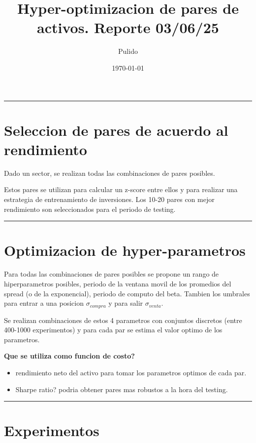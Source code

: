 \documentclass{myarticle}
\author{Pulido}
\date{\today}
\title{Hyper-optimizacion de pares de activos.  Reporte 03/06/25}
\begin{document}
\maketitle
\tableofcontents

\noindent\rule{\textwidth}{0.5pt}
\section{Seleccion de pares de acuerdo al rendimiento}
\label{sec:orgd8a89e0}

Dado un sector, se realizan todas las combinaciones de pares posibles.

Estos pares se utilizan para calcular un z-score entre ellos y para realizar una estrategia de entrenamiento de inversiones. Los 10-20 pares con mejor rendimiento son seleccionados para el periodo de testing.





\noindent\rule{\textwidth}{0.5pt}
\section{Optimizacion de hyper-parametros}
\label{sec:org87974ac}

Para todas las combinaciones de pares posibles se propone un rango de hiperparametros posibles, periodo de la ventana movil de los promedios del spread (o de la exponencial), periodo de computo del beta. Tambien los umbrales para entrar a una posicion \(\sigma_{compra}\) y para salir \(\sigma_{venta}\).

Se realizan combinaciones de estos 4 parametros con conjuntos discretos (entre 400-1000 experimentos) y para cada par se estima el valor optimo de los parametros.

\textbf{Que se utiliza como funcion de costo?}

\begin{itemize}
\item rendimiento neto del activo para tomar los parametros optimos de cada par.

\item Sharpe ratio? podria obtener pares mas robustos a la hora del testing.
\end{itemize}





\noindent\rule{\textwidth}{0.5pt}
\section{Experimentos}
\label{sec:orgc887d67}
\end{document}
